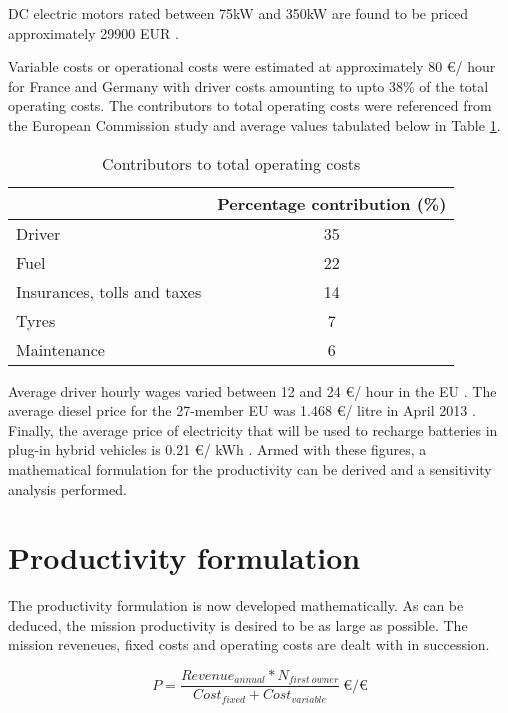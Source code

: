 \documentclass[ExampleMasters.tex]{subfiles}
\begin{document}
		DC electric motors rated between 75kW and 350kW are found to be priced approximately 29900 EUR \cite{EuPLot30Motors}.

		Variable costs or operational costs were estimated at approximately 80 \euro / hour for France and Germany \cite{EuAECOM1} with driver costs amounting to upto 38\% of the total operating costs. The contributors to total operating costs were referenced from the European Commission study \cite[T.~7b]{EuAECOM2} and average values tabulated below in Table \ref{table:OperatingCostContributors}.\\

		\begin{table}[ht]
			\centering 
			\begin{tabular}{l c}
				\hline
				\ & Percentage contribution (\%)\\
				\hline
			    Driver  & 35\\
			    Fuel  & 22\\
			    Insurances, tolls and taxes & 14\\
			    Tyres & 7\\
			    Maintenance & 6\\
				\hline 
			\end{tabular}
			\caption{Contributors to total operating costs \cite[T.~7b]{EuAECOM2}} 
			\label{table:OperatingCostContributors} 
		\end{table}

		Average driver hourly wages varied between 12 and 24 \euro / hour in the EU \cite[T.~7.2]{EuAECOM1}. The average diesel price for the 27-member EU was 1.468 \euro / litre in April 2013 \cite[T.~7.3]{EuAECOM1}. Finally, the average price of electricity that will be used to recharge batteries in plug-in hybrid vehicles is 0.21 \euro / kWh \cite{EUelectricity}. Armed with these figures, a mathematical formulation for the productivity can be derived and a sensitivity analysis performed.  

	\section{Productivity formulation}

		The productivity formulation is now developed mathematically. As can be deduced, the mission productivity is desired to be as large as possible. The mission reveneues, fixed costs and operating costs are dealt with in succession.

		\begin{equation} \label{eq:productivity}
			P = \frac{Revenue_{annual}*N_{first\ owner}}{Cost_{fixed} + Cost_{variable}}\ \euro/\euro
		\end{equation}
\end{document}
